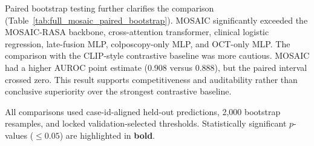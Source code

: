 \documentclass[11pt, a4paper]{article}
\theoremstyle{plain}
\theoremstyle{definition}
\begin{document}
Paired bootstrap testing further clarifies the comparison (Table~\ref{tab:full_mosaic_paired_bootstrap}). MOSAIC significantly exceeded the MOSAIC-RASA backbone, cross-attention transformer, clinical logistic regression, late-fusion MLP, colposcopy-only MLP, and OCT-only MLP. The comparison with the CLIP-style contrastive baseline was more cautious. MOSAIC had a higher AUROC point estimate (0.908 versus 0.888), but the paired interval crossed zero. This result supports competitiveness and auditability rather than conclusive superiority over the strongest contrastive baseline.

\begin{table}[!htbp]
  \centering
  \caption{Paired-bootstrap comparison of MOSAIC with same-split baselines. Positive values favour MOSAIC.}
  \label{tab:full_mosaic_paired_bootstrap}
  \scriptsize
  \begin{threeparttable}
  \begin{tablenotes}[flushleft]
    \footnotesize
    \item All comparisons used case-id-aligned held-out predictions, 2,000 bootstrap resamples, and locked validation-selected thresholds. Statistically significant \(p\)-values (\(\leq 0.05\)) are highlighted in \textbf{bold}.
  \end{tablenotes}
  \end{threeparttable}
\end{table}
\end{document}
